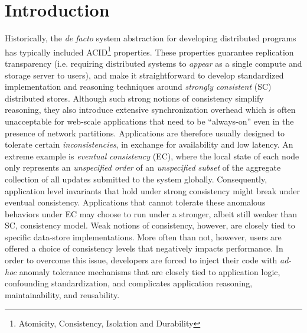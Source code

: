 \section{Introduction}
\label{sec:intro}

Historically, the \emph{de facto} system abstraction for developing
distributed programs has typically included ACID\footnote{Atomicity,
  Consistency, Isolation and Durability} properties.  These properties
guarantee replication transparency (i.e. requiring distributed systems
to \emph{appear} as a single compute and storage server to users), and
make it straightforward to develop standardized implementation and
reasoning techniques around \emph{strongly consistent} (SC)
distributed stores.  Although such strong notions of consistency
simplify reasoning, they also introduce extensive synchronization
overhead which is often unacceptable for web-scale applications that
need to be ``always-on'' even in the presence of network partitions.
Applications are therefore usually designed to tolerate certain
\emph{inconsistencies}, in exchange for availability and low latency.
An extreme example is \emph{eventual consistency} (EC), where the
local state of each node only represents an \emph{unspecified order}
of an \emph{unspecified subset} of the aggregate collection of all
updates submitted to the system globally.  Consequently, application
level invariants that hold under strong consistency might break under
eventual consistency.  Applications that cannot tolerate these
anomalous behaviors under EC may choose to run under a stronger,
albeit still weaker than SC, consistency model.  Weak notions of
consistency, however, are closely tied to specific data-store
implementations. More often than not, however, users are offered a
choice of consistency levels that negatively impacts performance.  In
order to overcome this issue, developers are forced to inject their
code with \emph{ad-hoc} anomaly tolerance mechanisms that are closely
tied to application logic, confounding standardization, and
complicates application reasoning, maintainability, and reusability.

%
%

